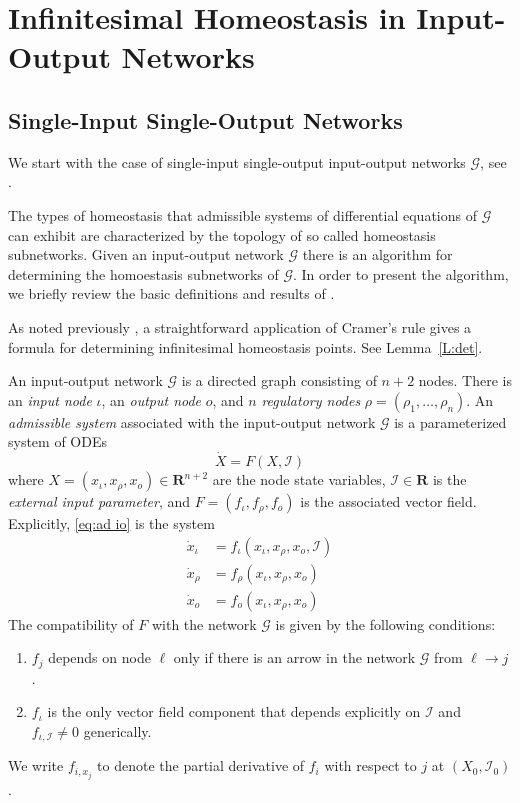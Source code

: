 \documentclass[pdflatex,sn-basic,Numbered]{sn-jnl}
\newcommand{\GG}{{\mathcal G}}
\newcommand{\II}{{\mathcal I}}
\newcommand{\R}{{\mathbf R}}
\theoremstyle{thmstyleone}%
\numberwithin{equation}{section}
\begin{document}
\section{Infinitesimal Homeostasis in Input-Output Networks}
\label{sec:homeostasis-theory}

\subsection{Single-Input Single-Output Networks}
\label{sec:singleinput}

We start with the case of single-input single-output input-output networks $\GG$, see \cite{GW20,WHAG21}.

The types of homeostasis that admissible systems of differential equations of $\GG$ can exhibit are characterized by the topology of so called homeostasis subnetworks.
Given an input-output network $\GG$ there is an algorithm for determining the homoestasis subnetworks of $\GG$.
In order to present the algorithm, we briefly review the basic definitions and results of \cite{WHAG21}.

As noted previously \cite{GS17,RBGSN17,GW20}, a straightforward application of Cramer's rule gives a formula for determining  infinitesimal homeostasis points.  See Lemma~\ref{L:det}.

An input-output network $\GG$ is a directed graph consisting of $n+2$ nodes. 
There is an {\em input node} $\iota$, an {\em output node} $o$, and $n$ {\em regulatory nodes} $\rho = (\rho_1,\ldots,\rho_n)$.
An {\em admissible system} associated with the input-output network $\GG$ is a parameterized system of ODEs
\begin{equation}\label{eq:ad io}
\dot{X} = F(X, \II)
\end{equation}
where $X = (x_\iota,x_\rho,x_o) \in \R^{n+2}$ are the node state variables, $\II\in\R$ is the {\em external input parameter}, and $F = (f_\iota,f_{\rho},f_o)$ is the associated vector field.
Explicitly, \eqref{eq:ad io} is the system 
\begin{equation} \label{eq: io}
\begin{split}
\dot{x}_\iota & = 
f_\iota(x_\iota,x_\rho, x_o,\II) \\
\dot{x}_\rho & =
f_\rho(x_\iota,x_\rho,x_o) \\
\dot{x}_o & = f_o(x_\iota,x_\rho,x_o)
\end{split}
\end{equation}
The compatibility of $F$ with the network $\GG$ is given by the following conditions:
\begin{enumerate}[label=(\alph*)]
\item $f_j$ depends on node $\ell$ only if there is an arrow in the network $\GG$ from $\ell\to j$. 
\item $f_\iota$ is the only vector field component that depends explicitly on $\II$ and $f_{\iota,\II}\neq 0$ generically.
\end{enumerate}
We write $f_{i,x_j}$ to denote the partial derivative of $f_i$ with respect to $j$ at $(X_0,\II_0)$.
\end{document}
